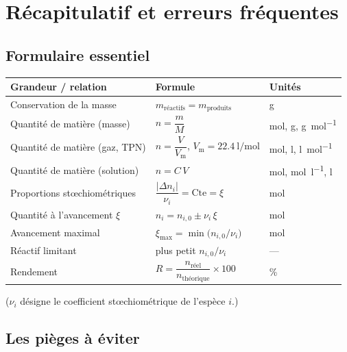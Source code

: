 \documentclass[11pt,a4paper]{article}
\newcommand{\gmol}{\si{\gram\per\mole}}
\newcommand{\molL}{\si{\mole\per\litre}}
\newcommand{\Lmol}{\si{\litre\per\mole}}
\newcommand{\Vm}{V_{\mathrm{m}}}          %
\begin{document}
\section{Récapitulatif et erreurs fréquentes}
\subsection{Formulaire essentiel}

\begin{center}
\renewcommand{\arraystretch}{1.5}
\begin{tabular}{>{\raggedright\arraybackslash}p{4.6cm} >{\centering\arraybackslash}p{4.4cm} >{\raggedright\arraybackslash}p{5.6cm}}
\toprule
\rowcolor{primary!12}
\textbf{Grandeur / relation} & \textbf{Formule} & \textbf{Unités}\\
\midrule
Conservation de la masse & $m_{\text{réactifs}}=m_{\text{produits}}$ & \si{\gram}\\
Quantité de matière (masse) & $n=\dfrac{m}{M}$ & \si{\mole}, \si{\gram}, \gmol\\
Quantité de matière (gaz, TPN) & $n=\dfrac{V}{\Vm}$,\; $\Vm=\SI{22,4}{\litre\per\mole}$ & \si{\mole}, \si{\litre}, \Lmol\\
Quantité de matière (solution) & $n=C\,V$ & \si{\mole}, \molL, \si{\litre}\\
Proportions stœchiométriques & $\dfrac{|\Delta n_i|}{\nu_i}=\text{Cte}=\xi$ & \si{\mole}\\
Quantité à l'avancement $\xi$ & $n_i=n_{i,0}\pm\nu_i\,\xi$ & \si{\mole}\\
Avancement maximal & $\xi_{\max}=\min\!\big(n_{i,0}/\nu_i\big)$ & \si{\mole}\\
Réactif limitant & plus petit $n_{i,0}/\nu_i$ & ---\\
Rendement & $R=\dfrac{n_{\text{réel}}}{n_{\text{théorique}}}\times100$ & \si{\percent}\\
\bottomrule
\end{tabular}
\end{center}
\noindent\footnotesize ($\nu_i$ désigne le coefficient stœchiométrique de l'espèce $i$.)
\normalsize

\subsection{Les pièges à éviter}
\end{document}
